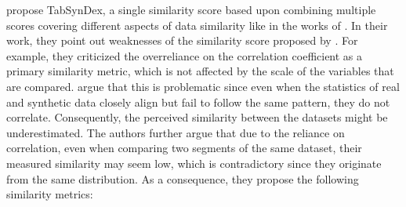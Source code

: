 \textcite{chundawat2022UniversalMetricRobust} propose TabSynDex, a single similarity score based upon combining multiple scores covering different aspects of data similarity like in the works of \cite{brenninkmeijer2019GenerationEvaluationTabular}.
In their work, they point out weaknesses of the similarity score proposed by \textcite{brenninkmeijer2019GenerationEvaluationTabular}.
For example, they criticized the overreliance on the correlation coefficient as a primary similarity metric, which is not affected by the scale of the variables that are compared.
\textcite{chundawat2022UniversalMetricRobust} argue that this is problematic since even when the statistics of real and synthetic data closely align but fail to follow the same pattern, they do not correlate. 
Consequently, the perceived similarity between the datasets might be underestimated.
The authors further argue that due to the reliance on correlation, even when comparing two segments of the same dataset, their measured similarity may seem low, which is contradictory since they originate from the same distribution.
As a consequence, they propose the following similarity metrics:

